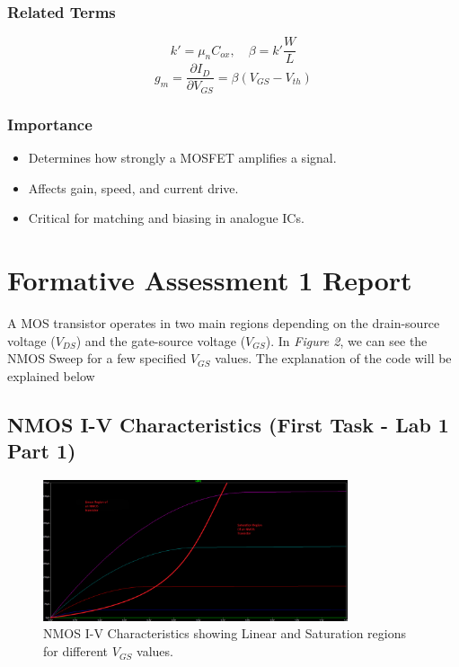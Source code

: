 \documentclass[a4paper,12pt]{article}
\begin{document}
\subsubsection{Related Terms}
\[
k' = \mu_n C_{ox}, \quad \beta = k'\frac{W}{L}
\]
\[
g_m = \frac{\partial I_D}{\partial V_{GS}} = \beta(V_{GS} - V_{th})
\]

\subsubsection{Importance}
\begin{itemize}
    \item Determines how strongly a MOSFET amplifies a signal.
    \item Affects gain, speed, and current drive.
    \item Critical for matching and biasing in analogue ICs.
\end{itemize}

\section{Formative Assessment 1 Report}

A MOS transistor operates in two main regions depending on the drain-source voltage ($V_{DS}$) and the gate-source voltage ($V_{GS}$).
In \textit{Figure 2}, we can see the NMOS Sweep for a few specified $V_{GS}$ values. The explanation of the code will be explained below

\subsection{NMOS I-V Characteristics (First Task - Lab 1 Part 1)}

\begin{figure}[h!]
    \centering
    \includegraphics[width=0.8\textwidth]{NMOSSweep.png}
    \caption{NMOS I-V Characteristics showing Linear and Saturation regions for different $V_{GS}$ values.}
    \label{fig:nmos_sweep}
\end{figure}
\end{document}
